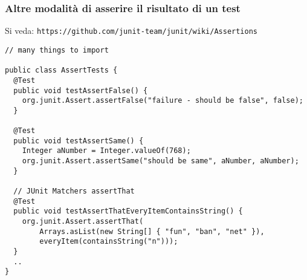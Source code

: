 \documentclass[presentation]{beamer}
\begin{document}
\begin{frame}[fragile]\frametitle{Altre modalità di asserire il risultato di un test}
Si veda: \texttt{https://github.com/junit-team/junit/wiki/Assertions}
\begin{lstlisting}[basicstyle=\ssmall\ttfamily]
// many things to import

public class AssertTests {
  @Test
  public void testAssertFalse() {
    org.junit.Assert.assertFalse("failure - should be false", false);
  }

  @Test
  public void testAssertSame() {
    Integer aNumber = Integer.valueOf(768);
    org.junit.Assert.assertSame("should be same", aNumber, aNumber);
  }

  // JUnit Matchers assertThat
  @Test
  public void testAssertThatEveryItemContainsString() {
    org.junit.Assert.assertThat(
        Arrays.asList(new String[] { "fun", "ban", "net" }), 
        everyItem(containsString("n")));
  }
  ..
}
\end{lstlisting}
\end{frame}







\end{document}
